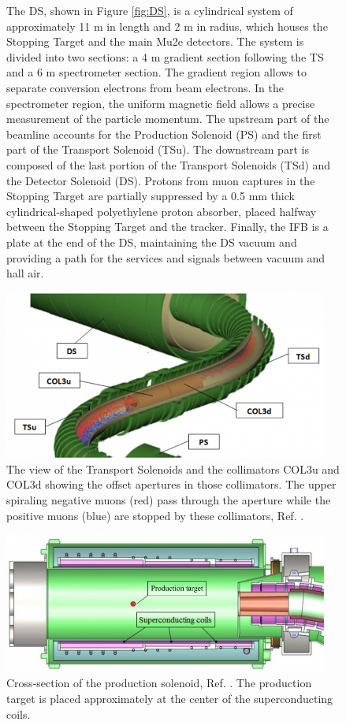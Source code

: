 \begin{figure}[!h]
{The DS, shown in Figure \ref{fig:DS}, is a cylindrical system of approximately 11 m in length and 2 m in radius, which houses the Stopping Target and the main Mu2e detectors. The system is divided into two sections: a 4 m gradient section following the TS and a 6 m spectrometer section. The gradient region allows to separate conversion electrons from beam electrons. In the spectrometer region, the uniform magnetic field allows a precise measurement of the particle momentum. The upstream part of the beamline accounts for the Production Solenoid (PS) and the first part of the Transport Solenoid (TSu). The downstream part is composed of the last portion of the Transport Solenoids (TSd) and the Detector Solenoid (DS). Protons from muon captures in the Stopping Target are partially suppressed by a 0.5 mm thick cylindrical-shaped polyethylene proton absorber, placed halfway between the Stopping Target and the tracker. Finally, the IFB is a plate at the end of the DS, maintaining the DS vacuum and providing a path for the services and signals between vacuum and hall air.
}
\label{fig:muonbeamline}
\end{figure}
\begin{figure}[!h]
\centering
\includegraphics[width =0.95\textwidth]{figures/png/800px-MuonBeamlineCollimators2.png}
\caption{The view of the Transport Solenoids and the collimators COL3u and COL3d showing the offset apertures in those collimators. The upper spiraling negative muons (red) pass through the aperture while the positive muons (blue) are stopped by these collimators, Ref. \cite{tsview}.}
\label{fig:collimators}
\end{figure}
\begin{figure}[!h]
\centering
\includegraphics[width =0.95\textwidth]{figures/png/800px-Production_solenoid.png}
\caption{Cross-section of the production solenoid, Ref. \cite{6376120}.
The production target is placed approximately at the center of the superconducting coils.}
\label{fig:PS}
\end{figure}
